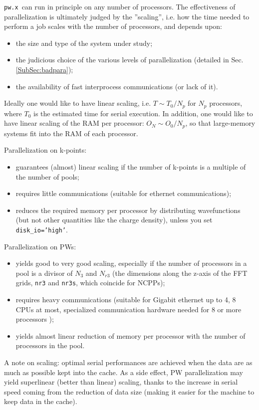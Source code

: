 \documentclass[12pt,a4paper]{article}
\def\pwx{\texttt{pw.x}}
\begin{document}
\pwx\ can run in principle on any number of processors.
The effectiveness of parallelization is ultimately judged by the 
''scaling'', i.e. how the time needed to perform a job scales
 with the number of processors, and depends upon:
\begin{itemize}
\item the size and type of the system under study;
\item the judicious choice of the various levels of parallelization 
(detailed in Sec.\ref{SubSec:badpara});
\item the availability of fast interprocess communications (or lack of it).
\end{itemize}
Ideally one would like to have linear scaling, i.e. $T \sim T_0/N_p$ for 
$N_p$ processors, where $T_0$ is the estimated time for serial execution.
 In addition, one would like to have linear scaling of
the RAM per processor: $O_N \sim O_0/N_p$, so that large-memory systems
fit into the RAM of each processor.

Parallelization on k-points:
\begin{itemize}
\item guarantees (almost) linear scaling if the number of k-points
is a multiple of the number of pools;
\item requires little communications (suitable for ethernet communications);
\item reduces the required memory per processor by distributing wavefunctions
(but not other quantities like the charge density), unless you set 
\texttt{disk\_io='high'}.
\end{itemize}
Parallelization on PWs:
\begin{itemize}
\item yields good to very good scaling, especially if the number of processors
in a pool is a divisor of $N_3$ and $N_{r3}$ (the dimensions along the z-axis 
of the FFT grids, \texttt{nr3} and \texttt{nr3s}, which coincide for NCPPs);
\item requires heavy communications (suitable for Gigabit ethernet up to 
4, 8 CPUs at most, specialized communication hardware needed for 8 or more
processors );
\item yields almost linear reduction of memory per processor with the number
of processors in the pool.
\end{itemize}

A note on scaling: optimal serial performances are achieved when the data are
as much as possible kept into the cache. As a side effect, PW
parallelization may yield superlinear (better than linear) scaling,
thanks to the increase in serial speed coming from the reduction of data size 
(making it easier for the machine to keep data in the cache).
\end{document}
